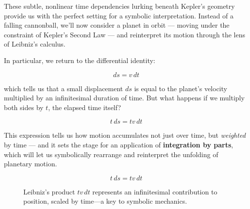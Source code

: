 \noindent These subtle, nonlinear time dependencies lurking beneath Kepler’s geometry provide us with the perfect setting for a symbolic interpretation. Instead of a falling cannonball, we’ll now consider a planet in orbit — moving under the constraint of Kepler’s Second Law — and reinterpret its motion through the lens of Leibniz’s calculus.

\medskip

\noindent In particular, we return to the differential identity:

\[
ds = v\,dt
\]

which tells us that a small displacement \( ds \) is equal to the planet’s velocity multiplied by an infinitesimal duration of time. But what happens if we multiply both sides by \( t \), the elapsed time itself?

\[
t\,ds = t v\,dt
\]

This expression tells us how motion accumulates not just over time, but \textit{weighted} by time — and it sets the stage for an application of \textbf{integration by parts}, which will let us symbolically rearrange and reinterpret the unfolding of planetary motion.



\[
t\,ds = t v\,dt
\]

\begin{figure}[H]
  \centering
  \caption{Leibniz’s product $tv\,dt$ represents an infinitesimal contribution to position, scaled by time—a key to symbolic mechanics.}
\end{figure}
  



